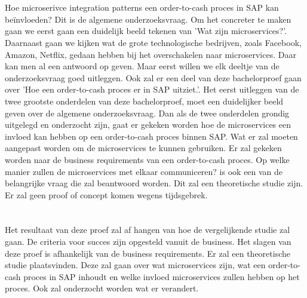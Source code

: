 \section{}
\label{sec:onderzoeksvraag}
Hoe microserivce integration patterns een order-to-cash proces in SAP kan beïnvloeden? Dit is de algemene onderzoeksvraag. Om het concreter te maken gaan we eerst gaan een duidelijk beeld tekenen van 'Wat zijn microservices?'. Daarnaast gaan we kijken wat de grote technologische bedrijven, zoals Facebook, Amazon, Netflix, gedaan hebben bij het overschakelen naar microservices. Daar kan men al een antwoord op geven. Maar eerst willen we elk deeltje van de onderzoeksvraag goed uitleggen. Ook zal er een deel van deze bachelorproef gaan over 'Hoe een order-to-cash proces er in SAP uitziet.'. Het eerst uitleggen van de twee grootste onderdelen van deze bachelorproef, moet een duidelijker beeld geven over de algemene onderzoeksvraag. Dan als de twee onderdelen grondig uitgelegd en onderzocht zijn, gaat er gekeken worden hoe de microservices een invloed kan hebben op een order-to-cash proces binnen SAP. Wat er zal moeten aangepast worden om de microservices te kunnen gebruiken. Er zal gekeken worden naar de business requirements van een order-to-cash proces. Op welke manier zullen de microservices met elkaar communiceren? is ook een van de belangrijke vraag die zal beantwoord worden. Dit zal een theoretische studie zijn. Er zal geen proof of concept komen wegens tijdsgebrek. 

\section{}
\label{sec:onderzoeksdoelstelling}
Het resultaat van deze proef zal af hangen van hoe de vergelijkende studie zal gaan. De criteria voor succes zijn opgesteld vanuit de business. Het slagen van deze proef is afhankelijk van de business requirements. Er zal een theoretische studie plaatsvinden. Deze zal gaan over wat microservices zijn, wat een order-to-cash proces in SAP inhoudt en welke invloed microservices zullen hebben op het proces. Ook zal onderzocht worden wat er verandert.

\section{}
\label{sec:opzet-bachelorproef}

